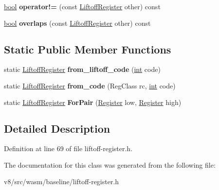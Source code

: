 \begin{DoxyCompactItemize}
\item 
\mbox{\label{classv8_1_1internal_1_1wasm_1_1LiftoffRegister_a6d9fa3ecaafa12166879fb320b572c60}} 
\mbox{\hyperlink{classbool}{bool}} {\bfseries operator!=} (const \mbox{\hyperlink{classv8_1_1internal_1_1wasm_1_1LiftoffRegister}{Liftoff\+Register}} other) const
\item 
\mbox{\label{classv8_1_1internal_1_1wasm_1_1LiftoffRegister_a362e2adb6a60df3a3dfe814edc1f2d25}} 
\mbox{\hyperlink{classbool}{bool}} {\bfseries overlaps} (const \mbox{\hyperlink{classv8_1_1internal_1_1wasm_1_1LiftoffRegister}{Liftoff\+Register}} other) const
\end{DoxyCompactItemize}
\subsection*{Static Public Member Functions}
\begin{DoxyCompactItemize}
\item 
\mbox{\label{classv8_1_1internal_1_1wasm_1_1LiftoffRegister_a24497762c993ca062927725a767e5c55}} 
static \mbox{\hyperlink{classv8_1_1internal_1_1wasm_1_1LiftoffRegister}{Liftoff\+Register}} {\bfseries from\+\_\+liftoff\+\_\+code} (\mbox{\hyperlink{classint}{int}} code)
\item 
\mbox{\label{classv8_1_1internal_1_1wasm_1_1LiftoffRegister_a435030157e362bc9c5e91f14baa3bd3d}} 
static \mbox{\hyperlink{classv8_1_1internal_1_1wasm_1_1LiftoffRegister}{Liftoff\+Register}} {\bfseries from\+\_\+code} (Reg\+Class rc, \mbox{\hyperlink{classint}{int}} code)
\item 
\mbox{\label{classv8_1_1internal_1_1wasm_1_1LiftoffRegister_aba984185e44078fb6d825166349baf59}} 
static \mbox{\hyperlink{classv8_1_1internal_1_1wasm_1_1LiftoffRegister}{Liftoff\+Register}} {\bfseries For\+Pair} (\mbox{\hyperlink{classv8_1_1internal_1_1Register}{Register}} low, \mbox{\hyperlink{classv8_1_1internal_1_1Register}{Register}} high)
\end{DoxyCompactItemize}


\subsection{Detailed Description}


Definition at line 69 of file liftoff-\/register.\+h.



The documentation for this class was generated from the following file\+:\begin{DoxyCompactItemize}
\item 
v8/src/wasm/baseline/liftoff-\/register.\+h\end{DoxyCompactItemize}

